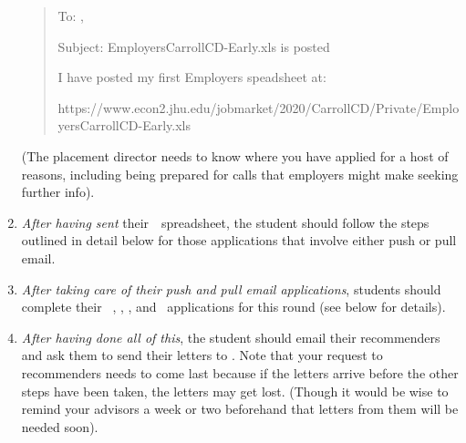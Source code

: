 \documentclass{\econtex}
\newcommand\redout{\bgroup\markoverwith
  {\textcolor{red}{\rule[.5ex]{2pt}{1pt}}}\ULon}
\begin{document}
\begin{enumerate}
  \begin{quote}
    \begin{texttt}
      To: \jmstaffemail , \JMPOEmail
      
      Subject: EmployersCarrollCD-Early.xls is posted

      \indent I have posted my first Employers speadsheet at:

      https://www.econ2.jhu.edu/jobmarket/2020/CarrollCD/Private/EmployersCarrollCD-Early.xls
      
    \end{texttt}
  \end{quote}    

  (The placement director needs to know where you have applied for a host of reasons, including being prepared for calls that employers might make seeking further info).


\item \textit{After having sent} their~{\EMW}~spreadsheet, the student
  should follow the steps outlined in detail below for those
  applications that involve either push or pull email.

\item \textit{After taking care of their push and pull email applications}, students should complete their {\EJM}~, \AJO, \AEA, and \Interfolio~applications for this round (see below for details).

\item \textit{After having done all of this}, the student should email
  their recommenders and ask them to send their letters to
  \jmstaffemail.  Note that your request to recommenders needs to come
  last because if the letters arrive before the other steps have been
  taken, the letters may get lost.  (Though it would be wise to remind
  your advisors a week or two beforehand that letters from them will
  be needed soon).

\end{enumerate}
\end{document}
